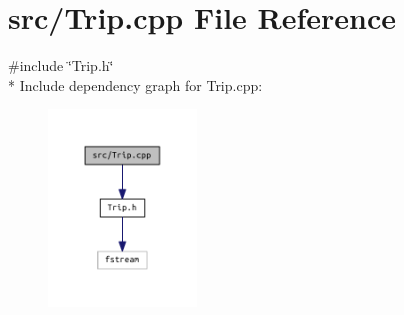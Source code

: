 \section{src/\+Trip.cpp File Reference}
\label{_trip_8cpp}
{\ttfamily \#include \char`\"{}Trip.\+h\char`\"{}}\\*
Include dependency graph for Trip.\+cpp\+:\nopagebreak
\begin{figure}[H]
\begin{center}
\leavevmode
\includegraphics[width=112pt]{_trip_8cpp__incl}
\end{center}
\end{figure}

